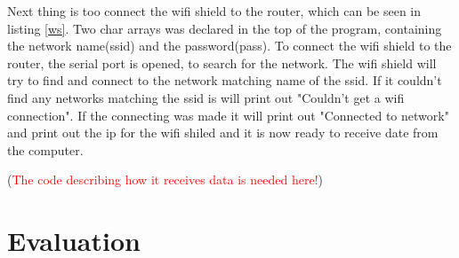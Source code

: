 Next thing is too connect the wifi shield to the router, which can be seen in listing \ref{ws}. Two char arrays was declared in the top of the program, containing the network name(ssid) and the password(pass).\newline
To connect the wifi shield to the router, the serial port is opened, to search for the network. The wifi shield will try to find and connect to the network matching name of the ssid. 
If it couldn't find any networks matching the ssid is will print out "Couldn't get a wifi connection". If the connecting was made it will print out "Connected to network" and print out the ip for the wifi shiled and it is now ready to receive date from the computer.

(\textcolor{red}{The code describing how it receives data is needed here!})

\section{Evaluation}
\label{sec:i2Evaluation}

